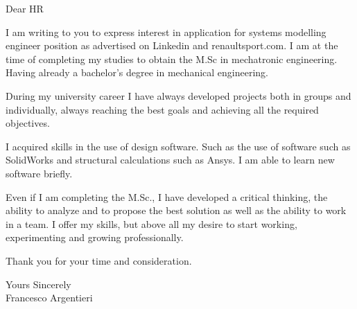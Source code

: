 \documentclass[a4paper,english]{friggeri-letter}
\begin{document}

\address{
   Circonvallazione Istoniense, 20 \\
   Vasto (CH), 66054 \\
   Italy
}




\opening{Dear HR}

I am writing to you to express interest in application for systems modelling engineer 
position as advertised on Linkedin and renaultsport.com. I am at the
time of completing my studies to obtain the M.Sc in mechatronic engineering.
Having already a bachelor's degree in mechanical engineering.

During my university career I have always developed projects both in groups and
individually, always reaching the best goals and achieving all the required
objectives.

I acquired skills in the use of design software. Such as the use of software
such as SolidWorks and structural calculations such as Ansys. I am able to learn
new software briefly.

Even if I am completing the M.Sc., I have developed a critical thinking, the
ability to analyze and to propose the best solution as well as the ability to
work in a team. I offer my skills, but above all my desire to start working,
experimenting and growing professionally.

Thank you for your time and consideration.

\closing{
   Yours Sincerely\\
   Francesco Argentieri}
\end{document}
